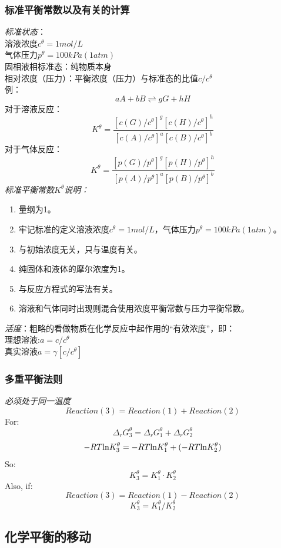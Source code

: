 \documentclass[utf8,a4paper,12pt]{ctexart}
\begin{document}
\subsubsection{标准平衡常数以及有关的计算}
\emph{标准状态}：\\
溶液浓度$c^{\theta} = 1mol/L$\\
气体压力$p^{\theta} = 100kPa (1atm)$\\
固相液相标准态：纯物质本身\\
相对浓度（压力）：平衡浓度（压力）与标准态的比值$c/c^{\theta}$\\
例：
\[
aA + bB \rightleftharpoons gG + hH
\]
对于溶液反应：
\begin{equation}
K^{\theta} = \frac{[c(G)/c^{\theta}]^{g}[c(H)/c^{\theta}]^{h}}{[c(A)/c^{\theta}]^{a}[c(B)/c^{\theta}]^{b}} 
\end{equation}
对于气体反应：
\[
K^{\theta} = \frac{[p(G)/p^{\theta}]^{g}[p(H)/p^{\theta}]^{h}}{[p(A)/p^{\theta}]^{a}[p(B)/p^{\theta}]^{b}}
\]
\emph{标准平衡常数$K^{\theta}$说明：}
\begin{enumerate}[(1)]
\item 量纲为1。
\item 牢记标准的定义溶液浓度$c^{\theta} = 1mol/L$，气体压力$p^{\theta} = 100kPa (1atm)$。
\item 与初始浓度无关，只与温度有关。
\item 纯固体和液体的摩尔浓度为1。
\item 与反应方程式的写法有关。
\item 溶液和气体同时出现则混合使用浓度平衡常数与压力平衡常数。
\end{enumerate}
\emph{活度}：粗略的看做物质在化学反应中起作用的“有效浓度”，即：\\
理想溶液:$a = c/c^{\theta}$\\
真实溶液$a = \gamma[c/c^{\theta}]$\\
\subsubsection{多重平衡法则}
\emph{必须处于同一温度}
$$
Reaction(3) = Reaction(1) + Reaction(2)
$$
For: 
\[
\Delta_{r}G_{3}^{\theta} = \Delta_{r}G_{1}^{\theta} + \Delta_{r}G_{2}^{\theta}
\]
\[
-RT{\rm ln}K_{3}^{\theta} = -RT{\rm ln}K_{1}^{\theta} + (-RT{\rm ln}K_{2}^{\theta} )
\]
So:
\[
K_{3}^{\theta}  = K_{1}^{\theta} \cdot K_{2}^{\theta}
\]
Also, if: 
\[
Reaction(3) = Reaction(1) - Reaction(2)
\]
\[
K_{3}^{\theta} = K_{1}^{\theta}/K_{2}^{\theta}
\]

\subsection{化学平衡的移动}
\end{document}
